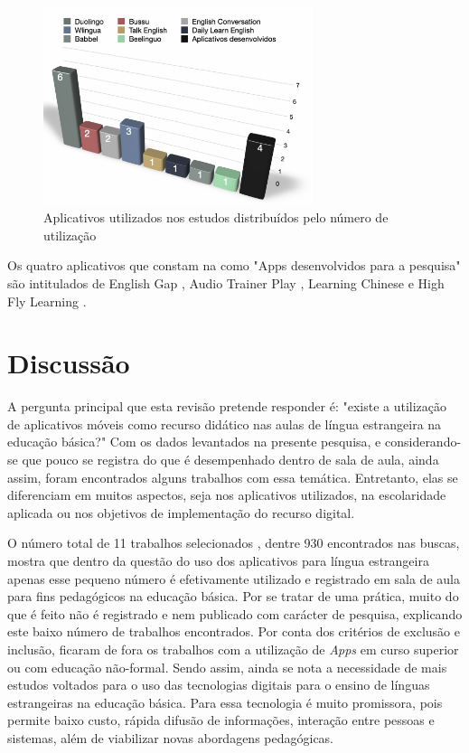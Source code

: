 \documentclass{textolivre}
\begin{document}
\begin{figure}[htbp]
 \centering
 \includegraphics[width=0.7\textwidth]{fig8.png}
 \caption{Aplicativos utilizados nos estudos distribuídos pelo número de utilização}
 \label{fig8}
\end{figure}

Os quatro aplicativos que constam na  como "Apps desenvolvidos para a pesquisa" são intitulados de English Gap \cite{rodrigues2014}, Audio Trainer Play \cite{redondo2017}, Learning Chinese \cite{lu2014} e High Fly Learning \cite{liz2015}.

\section{Discussão}
A pergunta principal que esta revisão pretende responder é: "existe a utilização de aplicativos móveis como recurso didático nas aulas de língua estrangeira na educação básica?" Com os dados levantados na presente pesquisa, e considerando-se que pouco se registra do que é desempenhado dentro de sala de aula, ainda assim, foram encontrados alguns trabalhos com essa temática. Entretanto, elas se diferenciam em muitos aspectos, seja nos aplicativos utilizados, na escolaridade aplicada ou nos objetivos de implementação do recurso digital.

O número total de 11 trabalhos selecionados \cite{censi2017, nascimento2017, montes2018, ximena2017, lu2014, rodrigues2014, magali2017, macias2016, redondo2017, liz2015}, dentre 930 encontrados nas buscas, mostra que dentro da questão do uso dos aplicativos para língua estrangeira apenas esse pequeno número é efetivamente utilizado e registrado em sala de aula para fins pedagógicos na educação básica. Por se tratar de uma prática, muito do que é feito não é registrado e nem publicado com carácter de pesquisa, explicando este baixo número de trabalhos encontrados. Por conta dos critérios de exclusão e inclusão, ficaram de fora os trabalhos com a utilização de \textit{Apps} em curso superior ou com educação não-formal. Sendo assim, ainda se nota a necessidade de mais estudos voltados para o uso das tecnologias digitais para o ensino de línguas estrangeiras na educação básica. Para \textcite{saccol2011} essa tecnologia é muito promissora, pois permite baixo custo, rápida difusão de informações, interação entre pessoas e sistemas, além de viabilizar novas abordagens pedagógicas.
	
\end{document}
